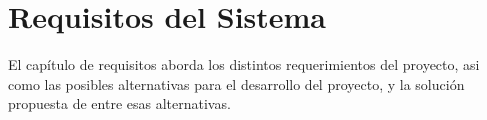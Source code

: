 

\chapter{Requisitos del Sistema}
\thispagestyle{chapterpage}

El capítulo de requisitos aborda los distintos requerimientos del proyecto, 
asi como las posibles alternativas para el desarrollo del proyecto, y la 
solución propuesta de entre esas alternativas.





